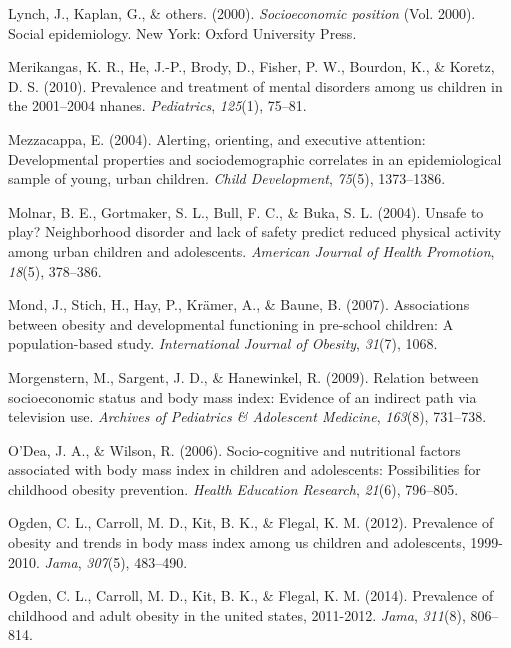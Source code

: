 \documentclass[man]{apa6}
\begin{document}
\leavevmode\hypertarget{ref-lynch2000socioeconomic}{}%
Lynch, J., Kaplan, G., \& others. (2000). \emph{Socioeconomic position} (Vol. 2000). Social epidemiology. New York: Oxford University Press.

\leavevmode\hypertarget{ref-merikangas2010prevalence}{}%
Merikangas, K. R., He, J.-P., Brody, D., Fisher, P. W., Bourdon, K., \& Koretz, D. S. (2010). Prevalence and treatment of mental disorders among us children in the 2001--2004 nhanes. \emph{Pediatrics}, \emph{125}(1), 75--81.

\leavevmode\hypertarget{ref-mezzacappa2004alerting}{}%
Mezzacappa, E. (2004). Alerting, orienting, and executive attention: Developmental properties and sociodemographic correlates in an epidemiological sample of young, urban children. \emph{Child Development}, \emph{75}(5), 1373--1386.

\leavevmode\hypertarget{ref-molnar2004unsafe}{}%
Molnar, B. E., Gortmaker, S. L., Bull, F. C., \& Buka, S. L. (2004). Unsafe to play? Neighborhood disorder and lack of safety predict reduced physical activity among urban children and adolescents. \emph{American Journal of Health Promotion}, \emph{18}(5), 378--386.

\leavevmode\hypertarget{ref-mond2007associations}{}%
Mond, J., Stich, H., Hay, P., Krämer, A., \& Baune, B. (2007). Associations between obesity and developmental functioning in pre-school children: A population-based study. \emph{International Journal of Obesity}, \emph{31}(7), 1068.

\leavevmode\hypertarget{ref-morgenstern2009relation}{}%
Morgenstern, M., Sargent, J. D., \& Hanewinkel, R. (2009). Relation between socioeconomic status and body mass index: Evidence of an indirect path via television use. \emph{Archives of Pediatrics \& Adolescent Medicine}, \emph{163}(8), 731--738.

\leavevmode\hypertarget{ref-o2006socio}{}%
O'Dea, J. A., \& Wilson, R. (2006). Socio-cognitive and nutritional factors associated with body mass index in children and adolescents: Possibilities for childhood obesity prevention. \emph{Health Education Research}, \emph{21}(6), 796--805.

\leavevmode\hypertarget{ref-ogden2012prevalence}{}%
Ogden, C. L., Carroll, M. D., Kit, B. K., \& Flegal, K. M. (2012). Prevalence of obesity and trends in body mass index among us children and adolescents, 1999-2010. \emph{Jama}, \emph{307}(5), 483--490.

\leavevmode\hypertarget{ref-ogden2014prevalence}{}%
Ogden, C. L., Carroll, M. D., Kit, B. K., \& Flegal, K. M. (2014). Prevalence of childhood and adult obesity in the united states, 2011-2012. \emph{Jama}, \emph{311}(8), 806--814.
\end{document}
